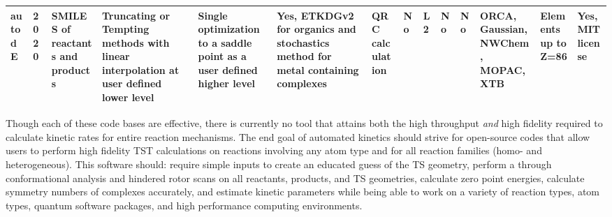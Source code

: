 \documentclass[preprint, 11pt]{elsarticle} %
\begin{document}
\begin{landscape}
\begin{singlespace}
\begin{scriptsize}
\begin{longtable}{| p{0.5in} | p{0.25in} | p{0.45in} | p{0.8in} | p{0.7in}| p{0.5in}| p{0.5in }| p{0.45in}| p{0.45in}| p{0.5in}| p{0.45in}| p{0.5in}| p{0.5in} | p{0.45in} |}
\\
\hline 
autodE & 2020 & SMILES of reactants and products & Truncating or Tempting methods with linear interpolation at user defined lower level & Single optimization to a saddle point as a user defined higher level & Yes, ETKDGv2 for organics and stochastics method for metal containing complexes & QRC calculation & No & L2 & No & No & ORCA, Gaussian, NWChem, MOPAC, XTB & Elements up to Z=86 & Yes, MIT license \\
\hline

\end{longtable}

\end{scriptsize}
\end{singlespace}
\end{landscape}

Though each of these code bases are effective, there is currently no tool that attains both the high throughput \textit{and} high fidelity required to calculate kinetic rates for entire reaction mechanisms.
The end goal of automated kinetics should strive for open-source codes that allow users to perform high fidelity TST calculations on reactions involving any atom type and for all reaction families (homo- and heterogeneous).
This software should: require simple inputs to create an educated guess of the TS geometry, perform a through conformational analysis and hindered rotor scans on all reactants, products, and TS geometries, calculate zero point energies, calculate symmetry numbers of complexes accurately, and estimate kinetic parameters while being able to work on a variety of reaction types, atom types, quantum software packages, and high performance computing environments.
\end{document}
